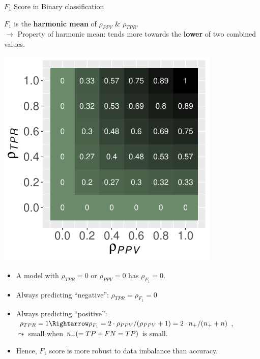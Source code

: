 \documentclass[11pt,compress,t,notes=noshow, xcolor=table]{beamer}
\begin{document}
\begin{vbframe}{$F_1$ Score in Binary classification}
	\footnotesize{
	
    	\begin{minipage}[c]{0.5\textwidth}
    		$F_1$ is the \textbf{harmonic mean} of $\rho_{PPV}$ \& $\rho_{TPR}$. \\
    		$\rightarrow$ Property of harmonic mean: tends more towards the \textbf{lower} of two combined values.
    	\end{minipage}%
    	\begin{minipage}[c]{0.5\textwidth}
    		\centering
    		\includegraphics[width=0.8\textwidth]{figure/f1_score_plot.pdf}
    	\end{minipage}
	
    	\begin{itemize}
    		\item A model with $\rho_{TPR} = 0$ %
      or 
    		$\rho_{PPV} = 0$ %
      has $\rho_{F_1} = 0$.
      
    		\item Always predicting \enquote{negative}: $\rho_{TPR} = \rho_{F_1} = 0$
      
    		\item Always predicting \enquote{positive}: $\rho_{TPR} = 1 \Rightarrow \rho_{F_1} = 2 \cdot \rho_{PPV} / 
    		(\rho_{PPV} + 1) = 2 \cdot \np / (\np + n)$,\\ 
    		$\leadsto$ small when $n_{+} (= TP + FN = TP)$  is small.
    
            \item Hence, $F_1$ score is more robust to data imbalance than accuracy.
      
    	\end{itemize}
	}
\end{vbframe}
\end{document}
